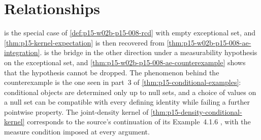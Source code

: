 \section{Relationships}
\label{sec:p15-w02b-p15-008-relationships}

 is the special case of
\cref{def:p15-w02b-p15-008-rcd} with empty exceptional set, and
\cref{thm:p15-kernel-expectation} is then recovered from
\cref{thm:p15-w02b-p15-008-ae-integration}.
 is the bridge in the other
direction under a measurability hypothesis on the exceptional set, and
\cref{thm:p15-w02b-p15-008-ae-counterexample} shows that the hypothesis
cannot be dropped. The phenomenon behind the counterexample is the one
seen in part~3 of \cref{thm:p15-conditional-examples}: conditional
objects are determined only up to null sets, and a choice of values on a
null set can be compatible with every defining identity while failing a
further pointwise property. The joint-density kernel of
\cref{thm:p15-density-conditional-kernel} corresponds to the source's
continuation of its Example~4.1.6 \cite[p.~214]{DurrettPTEAuthor2019},
with the measure condition imposed at every argument.
